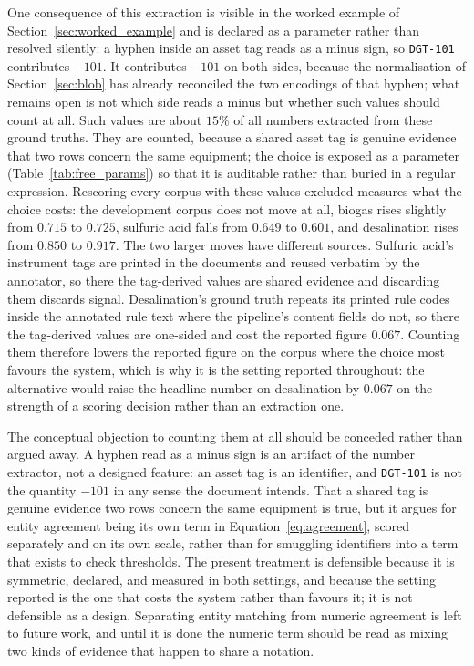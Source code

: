 \documentclass[11pt]{article}
\begin{document}
One consequence of this extraction is visible in the worked example of
Section~\ref{sec:worked_example} and is declared as a parameter rather than
resolved silently: a hyphen inside an asset tag reads as a minus sign, so
\texttt{DGT-101} contributes $-101$. It contributes $-101$ on both sides,
because the normalisation of Section~\ref{sec:blob} has already reconciled the
two encodings of that hyphen; what remains open is not which side reads a minus
but whether such values should count at all. Such values are about $15\%$ of all numbers extracted from
these ground truths. They are counted, because a shared asset tag is genuine
evidence that two rows concern the same equipment; the choice is exposed as a
parameter (Table~\ref{tab:free_params}) so that it is auditable rather than
buried in a regular expression. Rescoring every corpus with these values
excluded measures what the choice costs: the development corpus does not move at
all, biogas rises slightly from $0.715$ to $0.725$, sulfuric acid falls from
$0.649$ to $0.601$, and desalination rises from $0.850$ to $0.917$. The two
larger moves have different sources. Sulfuric acid's instrument tags are printed
in the documents and reused verbatim by the annotator, so there the tag-derived
values are shared evidence and discarding them discards signal. Desalination's
ground truth repeats its printed rule codes inside the annotated rule text where
the pipeline's content fields do not, so there the tag-derived values are
one-sided and cost the reported figure $0.067$. Counting them therefore lowers
the reported figure on the corpus where the choice most favours the system,
which is why it is the setting reported throughout: the alternative would raise
the headline number on desalination by $0.067$ on the strength of a scoring
decision rather than an extraction one.

The conceptual objection to counting them at all should be conceded rather than
argued away. A hyphen read as a minus sign is an artifact of the number
extractor, not a designed feature: an asset tag is an identifier, and
\texttt{DGT-101} is not the quantity $-101$ in any sense the document intends.
That a shared tag is genuine evidence two rows concern the same equipment is
true, but it argues for entity agreement being its own term in
Equation~\ref{eq:agreement}, scored separately and on its own scale, rather than
for smuggling identifiers into a term that exists to check thresholds. The
present treatment is defensible because it is symmetric, declared, and measured
in both settings, and because the setting reported is the one that costs the
system rather than favours it; it is not defensible as a design. Separating
entity matching from numeric agreement is left to future work, and until it is
done the numeric term should be read as mixing two kinds of evidence that
happen to share a notation.
\end{document}
